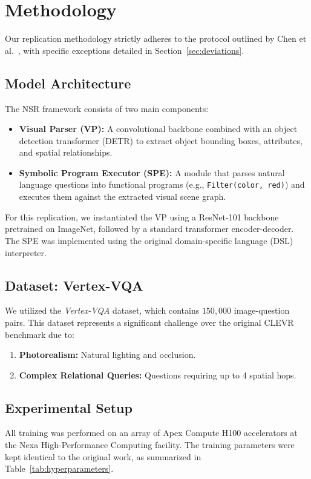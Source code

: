 \section{Methodology}
Our replication methodology strictly adheres to the protocol outlined by Chen et al.~\cite{chen2024neural}, with specific exceptions detailed in Section~\ref{sec:deviations}.

\subsection{Model Architecture}
The NSR framework consists of two main components:
\begin{itemize}
    \item \textbf{Visual Parser (VP):} A convolutional backbone combined with an object detection transformer (DETR) to extract object bounding boxes, attributes, and spatial relationships.
    \item \textbf{Symbolic Program Executor (SPE):} A module that parses natural language questions into functional programs (e.g., \texttt{Filter(color, red)}) and executes them against the extracted visual scene graph.
\end{itemize}

For this replication, we instantiated the VP using a ResNet-101 backbone pretrained on ImageNet, followed by a standard transformer encoder-decoder. The SPE was implemented using the original domain-specific language (DSL) interpreter.

\subsection{Dataset: Vertex-VQA}
We utilized the \emph{Vertex-VQA} dataset, which contains $150,000$ image-question pairs. This dataset represents a significant challenge over the original CLEVR benchmark due to:
\begin{enumerate}
    \item \textbf{Photorealism:} Natural lighting and occlusion.
    \item \textbf{Complex Relational Queries:} Questions requiring up to 4 spatial hops.
\end{enumerate}

\subsection{Experimental Setup}
All training was performed on an array of Apex Compute H100 accelerators at the Nexa High-Performance Computing facility. The training parameters were kept identical to the original work, as summarized in Table~\ref{tab:hyperparameters}.

